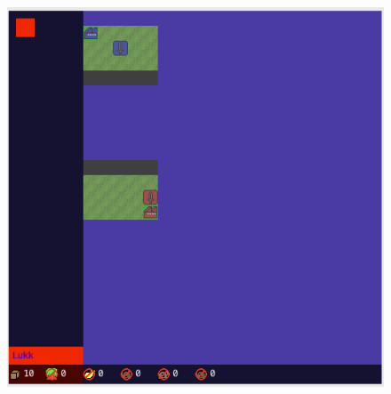 \begin{center}
\begin{figure}
\includegraphics[scale=0.75]{images/OppgradereEnv.png}
\label{fig:OppgradereEnv}
\end{figure}
\end{center}